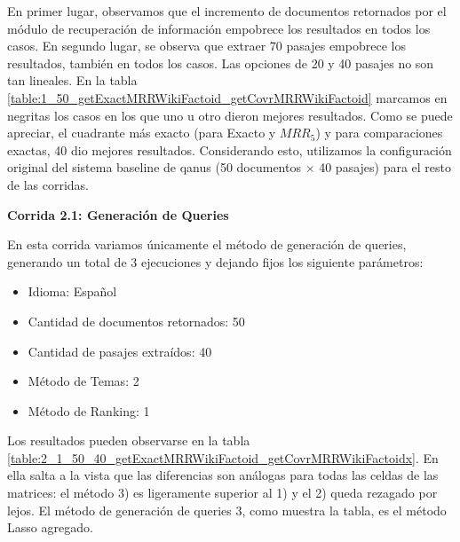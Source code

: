 En primer lugar, observamos que el incremento de documentos retornados por el módulo de recuperación de información empobrece los resultados en todos los casos.
En segundo lugar, se observa que extraer 70 pasajes empobrece los resultados, también en todos los casos. Las opciones de 20 y 40 pasajes no son tan lineales. En la tabla \ref{table:1_50_getExactMRRWikiFactoid_getCovrMRRWikiFactoid} marcamos en negritas los casos en los que uno u otro dieron mejores resultados. Como se puede apreciar, el cuadrante más exacto (para Exacto y $MRR_{5}$) y para comparaciones exactas, 40 dio mejores resultados. Considerando esto, utilizamos la configuración original del sistema baseline de qanus (50 documentos $\times$ 40 pasajes) para el resto de las corridas. \newline


\textbf{Corrida 2.1: Generación de Queries}\newline

En esta corrida variamos únicamente el método de generación de queries, generando un total de 3 ejecuciones y dejando fijos los siguiente parámetros: \newline

\begin{itemize}
  \item Idioma: Español
  \item Cantidad de documentos retornados: 50
  \item Cantidad de pasajes extraídos: 40
  \item Método de Temas: 2
  \item Método de Ranking: 1
\end{itemize}

Los resultados pueden observarse en la tabla \ref{table:2_1_50_40_getExactMRRWikiFactoid_getCovrMRRWikiFactoidx}. En ella salta a la vista que las diferencias son análogas para todas las celdas de las matrices: el método 3) es ligeramente superior al 1) y el 2) queda rezagado por lejos.
El método de generación de queries 3, como muestra la tabla, es el método Lasso agregado.\newline

